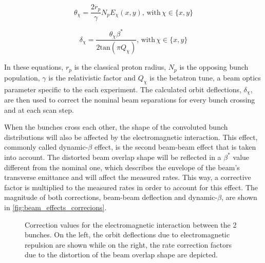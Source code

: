 \begin{equation}
	\theta_{\chi} = \frac{2r_p}{\gamma} N_p E_{\chi}(x, y), \, \mathrm{with} \, \chi \in \{ x, y \}
	\label{eq:beam_deflection_angle}
\end{equation}

\begin{equation}
	\delta_{\chi} = \frac{\theta_{\chi} \beta^{*}}{2 \mathrm{tan} \left( \pi Q_{\chi} \right)}, \, \mathrm{with} \, \chi \in \{ x, y \}
	\label{eq:beam_orbit_deflection}
\end{equation}

In these equations, $r_p$ is the classical proton radius, $N_p$ is the opposing bunch population, $\gamma$ is the relativistic factor and $Q_{\chi}$ is the betatron tune, a beam optics parameter specific to the each experiment. The calculated orbit deflections, $\delta_{\chi}$, are then used to correct the nominal beam separations for every bunch crossing and at each scan step.

When the bunches cross each other, the shape of the convoluted bunch distributions will also be affected by the electromagnetic interaction. This effect, commonly called dynamic-$\beta$ effect, is the second beam-beam effect that is taken into account. The distorted beam overlap shape will be reflected in a $\beta^{*}$ value different from the nominal one, which describes the envelope of the beam's transverse emittance and will affect the measured rates. This way, a corrective factor is multiplied to the measured rates in order to account for this effect. The magnitude of both corrections, beam-beam deflection and dynamic-$\beta$, are shown in \autoref{fig:beam_effects_correcions}.

\begin{figure}[!htb]
	\centering
	\caption[Electromagnetic interaction correction]{Correction values for the electromagnetic interaction between the 2 bunches. On the left, the orbit deflections due to electromagnetic repulsion are shown while on the right, the rate correction factors due to the distortion of the beam overlap shape are depicted.}
	\label{fig:beam_effects_correcions}
\end{figure}

